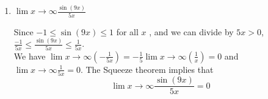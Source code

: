 \documentclass{ximera}
\begin{document}
\begin{problem}
\begin{enumerate}
		\item $\displaystyle \lim{x \to \infty} \frac{\sin(9x)}{5x}$
\begin{explanation}
		 Since $-1 \le  \sin(9x) \le 1$ for all $x$ , and we can divide by $5x>0$, $\frac{-1}{5x} \le  \frac{\sin(9x)}{5x} \le \frac{1}{5x}$.\\
		  We have $\displaystyle \lim{x \to \infty} \left(-\frac{1}{5x} \right) =-\frac{1}{5}\displaystyle \lim{x \to \infty} \left(\frac{1}{x} \right) = 0$ and $\displaystyle \lim{x \to \infty} \frac{1}{5x} = 0$.  The Squeeze theorem implies that
        \[
          \displaystyle \lim{x \to \infty} \frac{\sin(9x)}{5x} = 0
        \]
		\end{explanation}
	\end{enumerate}
\end{problem}
\end{document}
